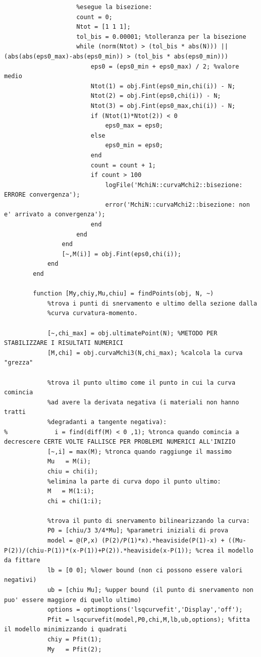 \documentclass[10pt]{article}
\begin{document}
\begin{lstlisting}
                    %esegue la bisezione:
                    count = 0;
                    Ntot = [1 1 1];
                    tol_bis = 0.00001; %tolleranza per la bisezione
                    while (norm(Ntot) > (tol_bis * abs(N))) || (abs(abs(eps0_max)-abs(eps0_min)) > (tol_bis * abs(eps0_min)))
                        eps0 = (eps0_min + eps0_max) / 2; %valore medio
                        Ntot(1) = obj.Fint(eps0_min,chi(i)) - N;
                        Ntot(2) = obj.Fint(eps0,chi(i)) - N;
                        Ntot(3) = obj.Fint(eps0_max,chi(i)) - N;
                        if (Ntot(1)*Ntot(2)) < 0
                            eps0_max = eps0;
                        else
                            eps0_min = eps0;
                        end
                        count = count + 1;
                        if count > 100
                            logFile('MchiN::curvaMchi2::bisezione: ERRORE convergenza');
                            error('MchiN::curvaMchi2::bisezione: non e' arrivato a convergenza');
                        end
                    end
                end
                [~,M(i)] = obj.Fint(eps0,chi(i));
            end
        end
        
        function [My,chiy,Mu,chiu] = findPoints(obj, N, ~)
            %trova i punti di snervamento e ultimo della sezione dalla
            %curva curvatura-momento.
            
            [~,chi_max] = obj.ultimatePoint(N); %METODO PER STABILIZZARE I RISULTATI NUMERICI
            [M,chi] = obj.curvaMchi3(N,chi_max); %calcola la curva "grezza"
            
            %trova il punto ultimo come il punto in cui la curva comincia
            %ad avere la derivata negativa (i materiali non hanno tratti
            %degradanti a tangente negativa):
%             i = find(diff(M) < 0 ,1); %tronca quando comincia a decrescere CERTE VOLTE FALLISCE PER PROBLEMI NUMERICI ALL'INIZIO
            [~,i] = max(M); %tronca quando raggiunge il massimo
            Mu   = M(i);
            chiu = chi(i);
            %elimina la parte di curva dopo il punto ultimo:
            M   = M(1:i);
            chi = chi(1:i);
            
            %trova il punto di snervamento bilinearizzando la curva:
            P0 = [chiu/3 3/4*Mu]; %parametri iniziali di prova
            model = @(P,x) (P(2)/P(1)*x).*heaviside(P(1)-x) + ((Mu-P(2))/(chiu-P(1))*(x-P(1))+P(2)).*heaviside(x-P(1)); %crea il modello da fittare
            lb = [0 0]; %lower bound (non ci possono essere valori negativi)
            ub = [chiu Mu]; %upper bound (il punto di snervamento non puo' essere maggiore di quello ultimo)
            options = optimoptions('lsqcurvefit','Display','off');
            Pfit = lsqcurvefit(model,P0,chi,M,lb,ub,options); %fitta il modello minimizzando i quadrati
            chiy = Pfit(1);
            My   = Pfit(2);
            

\end{lstlisting}
\end{document}
